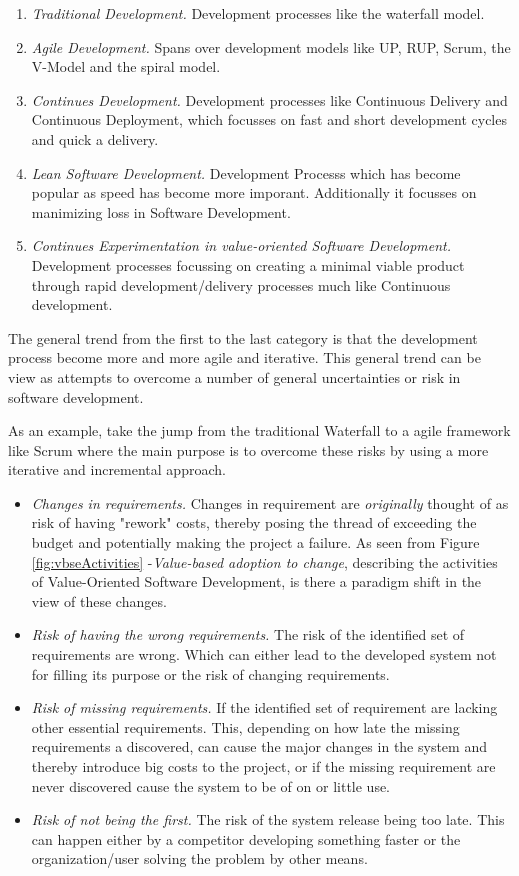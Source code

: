 \documentclass{sig-alternate}
\begin{document}
\begin{enumerate}
\item \textit{Traditional Development.} Development processes like the waterfall model.
\item \textit{Agile Development.} Spans over development models like UP, RUP, Scrum, the V-Model and the spiral model.
\item \textit{Continues Development.} Development processes like Continuous Delivery and Continuous Deployment, which focusses on fast and short development cycles and quick a delivery.
\item \textit{Lean Software Development.} Development Processs which has become popular as speed has become more imporant. Additionally it focusses on manimizing loss in Software Development.
\item \textit{Continues Experimentation in value-oriented Software Development.} Development processes focussing on creating a minimal viable product through rapid development/delivery processes much like Continuous development.
\end{enumerate}

The general trend from the first to the last category is that the development process become more and more agile and iterative. This general trend can be view as attempts to overcome a number of general uncertainties or risk in software development.

As an example, take the jump from the traditional Waterfall to a agile framework like Scrum where the main purpose is to overcome these risks by using a more iterative and incremental approach\cite{sutherland:scrum}.

\begin{itemize}
\item \textit{Changes in requirements.} Changes in requirement are \textit{originally} thought of as risk of having "rework" costs, thereby posing the thread of exceeding the budget and potentially making the project a failure. As seen from Figure \ref{fig:vbseActivities} -\textit{Value-based adoption to change}, describing the activities of Value-Oriented Software Development, is there a paradigm shift in the view of these changes.
\item \textit{Risk of having the wrong requirements.} The risk of the identified set of requirements are wrong. Which can either lead to the developed system not for filling its purpose or the risk of changing requirements.
\item \textit{Risk of missing requirements.} If the identified set of requirement are lacking other essential requirements. This, depending on how late the missing requirements a discovered, can cause the major changes in the system and thereby introduce big costs to the project, or if the missing requirement are never discovered cause the system to be of on or little use.
\item \textit{Risk of not being the first.} The risk of the system release being too late. This can happen either by a competitor developing something faster or the organization/user solving the problem by other means.
\end{itemize}
\end{document}
